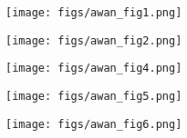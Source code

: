 

\begin{figure}[tbh!]
\vskip -0.1in
\texttt{[image: figs/awan\_fig1.png]}
\caption{}
\label{fig:seasonal_dithers}
\end{figure}

\begin{figure}[tbh!]
\vskip -0.1in
\texttt{[image: figs/awan\_fig2.png]}
\caption{}
\label{fig:nightly_dithers}
\end{figure}

\begin{figure}[tbh!]
\vskip -0.1in
\texttt{[image: figs/awan\_fig4.png]}
\caption{}
\label{fig:dithering_histograms}
\end{figure}

\begin{figure}[tbh!]
\vskip -0.1in
\texttt{[image: figs/awan\_fig5.png]}
\caption{}
\label{fig:dithering_skymaps}
\end{figure}

\begin{figure}[tbh!]
\vskip -0.1in
\texttt{[image: figs/awan\_fig6.png]}
\caption{}
\label{fig:dithering_power_spectra}
\end{figure}




